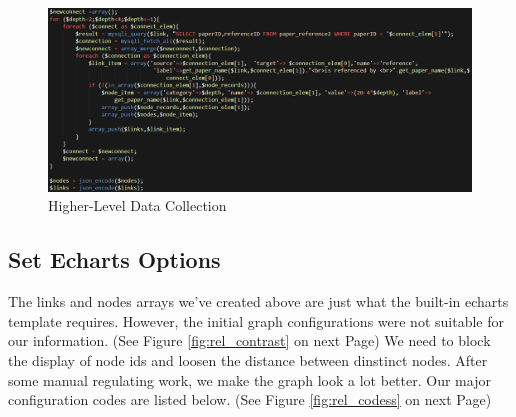 \documentclass{book}
\begin{document}
\begin{figure}[htp]
\centering
\includegraphics[scale=0.55]{img/zlt_rel_code_lev2.png}
\caption{Higher-Level Data Collection}
\label{fig:rel_high}
\end{figure}


\subsection{Set Echarts Options}

The links and nodes arrays we've created above are just what the built-in echarts template requires. However, the initial graph configurations were not suitable for our information. (See Figure \ref{fig:rel_contrast} on next Page) We need to block the display of node ids and loosen the distance between dinstinct nodes. After some manual regulating work, we make the graph look a lot better. Our major configuration codes are listed below. (See Figure \ref{fig:rel_codess} on next Page)
\end{document}
